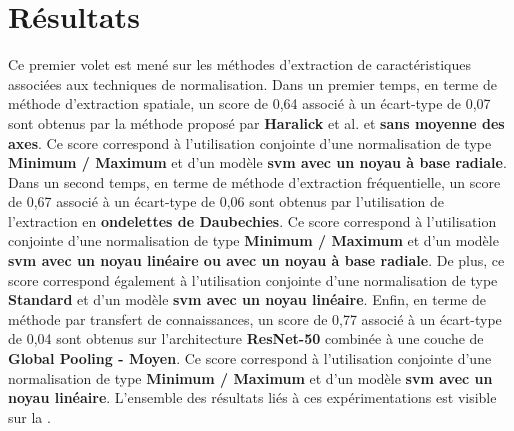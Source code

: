\section{Résultats}
Ce premier volet est mené sur les méthodes d'extraction de caractéristiques associées aux techniques de normalisation. Dans un premier temps, en terme de méthode d'extraction spatiale, un score de 0,64 associé à un écart-type de 0,07 sont obtenus par la méthode proposé par \textbf{Haralick} et al. et \textbf{sans moyenne des axes}. Ce score correspond à l'utilisation conjointe d'une normalisation de type \textbf{Minimum / Maximum} et d'un modèle \textbf{\gls{svm} avec un noyau à base radiale}. Dans un second temps, en terme de méthode d'extraction fréquentielle, un score de 0,67 associé à un écart-type de 0,06 sont obtenus par l'utilisation de l'extraction en \textbf{ondelettes de Daubechies}. Ce score correspond à l'utilisation conjointe d'une normalisation de type \textbf{Minimum / Maximum} et d'un modèle \textbf{\gls{svm} avec un noyau linéaire ou avec un noyau à base radiale}. De plus, ce score correspond également à l'utilisation conjointe d'une normalisation de type \textbf{Standard} et d'un modèle \textbf{\gls{svm} avec un noyau linéaire}. Enfin, en terme de méthode par transfert de connaissances, un score de 0,77 associé à un écart-type de 0,04 sont obtenus sur l'architecture \textbf{ResNet-50} combinée à une couche de \textbf{Global Pooling - Moyen}. Ce score correspond à l'utilisation conjointe d'une normalisation de type \textbf{Minimum / Maximum} et d'un modèle \textbf{\gls{svm} avec un noyau linéaire}. L'ensemble des résultats liés à ces expérimentations est visible sur la .\par

